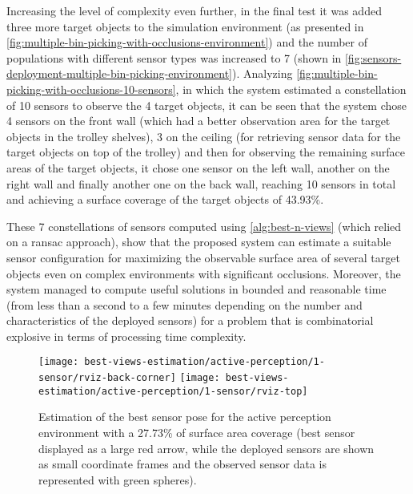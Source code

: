Increasing the level of complexity even further, in the final test it was added three more target objects to the simulation environment (as presented in \cref{fig:multiple-bin-picking-with-occlusions-environment}) and the number of populations with different sensor types was increased to 7 (shown in \cref{fig:sensors-deployment-multiple-bin-picking-environment}). Analyzing \cref{fig:multiple-bin-picking-with-occlusions-10-sensors}, in which the system estimated a constellation of 10 sensors to observe the 4 target objects, it can be seen that the system chose 4 sensors on the front wall (which had a better observation area for the target objects in the trolley shelves), 3 on the ceiling (for retrieving sensor data for the target objects on top of the trolley) and then for observing the remaining surface areas of the target objects, it chose one sensor on the left wall, another on the right wall and finally another one on the back wall, reaching 10 sensors in total and achieving a surface coverage of the target objects of 43.93\%.

These 7 constellations of sensors computed using \cref{alg:best-n-views} (which relied on a \gls{ransac} approach), show that the proposed system can estimate a suitable sensor configuration for maximizing the observable surface area of several target objects even on complex environments with significant occlusions. Moreover, the system managed to compute useful solutions in bounded and reasonable time (from less than a second to a few minutes depending on the number and characteristics of the deployed sensors) for a problem that is combinatorial explosive in terms of processing time complexity.

\begin{figure}
	\centering
	\texttt{[image: best-views-estimation/active-perception/1-sensor/rviz-back-corner]}\hspace{2em}
	\texttt{[image: best-views-estimation/active-perception/1-sensor/rviz-top]}
	\caption{Estimation of the best sensor pose for the active perception environment with a 27.73\% of surface area coverage (best sensor displayed as a large red arrow, while the deployed sensors are shown as small coordinate frames and the observed sensor data is represented with green spheres).}
	\label{fig:active-perception-1-sensor}
\end{figure}

